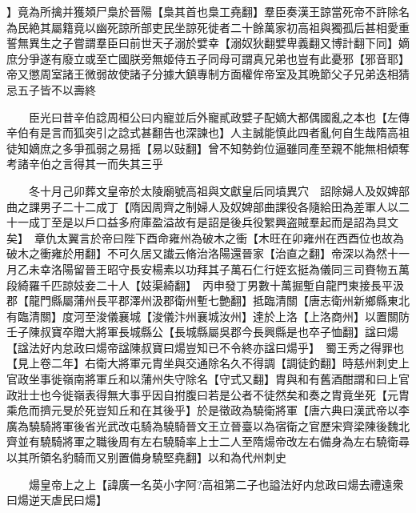 】竟為所擒并獲頍尸梟於晉陽【梟其首也梟工堯翻】羣臣奏漢王諒當死帝不許除名為民絶其屬籍竟以幽死諒所部吏民坐諒死徙者二十餘萬家初高祖與獨孤后甚相愛重誓無異生之子嘗謂羣臣曰前世天子溺於嬖幸【溺奴狄翻嬖卑義翻又博計翻下同】嫡庶分爭遂有廢立或至亡國朕旁無姬侍五子同母可謂真兄弟也豈有此憂邪【邪音耶】帝又懲周室諸王微弱故使諸子分據大鎮專制方面權侔帝室及其晩節父子兄弟迭相猜忌五子皆不以壽終

　　臣光曰昔辛伯諗周桓公曰内寵並后外寵貳政嬖子配嫡大都偶國亂之本也【左傳辛伯有是言而狐突引之諗式甚翻告也深諫也】人主誠能慎此四者亂何自生哉隋高祖徒知嫡庶之多爭孤弱之易摇【易以䜴翻】曾不知勢鈞位逼雖同產至親不能無相傾奪考諸辛伯之言得其一而失其三乎

　　冬十月己卯葬文皇帝於太陵廟號高祖與文獻皇后同墳異穴　詔除婦人及奴婢部曲之課男子二十二成丁【隋因周齊之制婦人及奴婢部曲課役各隨給田為差軍人以二十一成丁至是以戶口益多府庫盈溢故有是詔是後兵役䌓興盗賊羣起而是詔為具文矣】　章仇太翼言於帝曰陛下酉命雍州為破木之衝【木旺在卯雍州在西酉位也故為破木之衝雍於用翻】不可久居又䜟云脩治洛陽還晉家【治直之翻】帝深以為然十一月乙未幸洛陽留晉王昭守長安楊素以功拜其子萬石仁行姪玄挺為儀同三司賚物五萬段綺羅千匹諒妓妾二十人【妓渠綺翻】　丙申發丁男數十萬掘塹自龍門東接長平汲郡【龍門縣屬蒲州長平郡澤州汲郡衛州塹七艶翻】抵臨清關【唐志衛州新鄉縣東北有臨清關】度河至浚儀襄城【浚儀汴州襄城汝州】達於上洛【上洛商州】以置關防　壬子陳叔寶卒贈大將軍長城縣公【長城縣屬吳郡今長興縣是也卒子恤翻】諡曰煬【諡法好内怠政曰煬帝諡陳叔寶曰煬豈知已不令終亦諡曰煬乎】　蜀王秀之得罪也【見上卷二年】右衛大將軍元胄坐與交通除名久不得調【調徒釣翻】時慈州刺史上官政坐事徙嶺南將軍丘和以蒲州失守除名【守式又翻】胄與和有舊酒酣謂和曰上官政壯士也今徙嶺表得無大事乎因自拊腹曰若是公者不徒然矣和奏之胄竟坐死【元胄乘危而擠元旻於死豈知丘和在其後乎】於是徵政為驍衛將軍【唐六典曰漢武帝以李廣為驍騎將軍後省光武改屯騎為驍騎晉文王立晉臺以為宿衛之官歷宋齊梁陳後魏北齊並有驍騎將軍之職後周有左右驍騎率上士二人至隋煬帝改左右備身為左右驍衛尋以其所領名豹騎而又别置備身驍堅堯翻】以和為代州刺史

　　煬皇帝上之上【諱廣一名英小字阿?高祖第二子也謚法好内怠政曰煬去禮遠衆曰煬逆天虐民曰煬】

